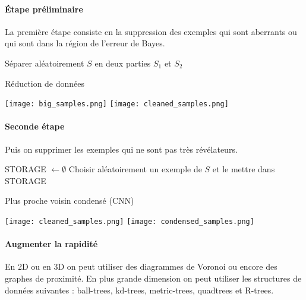 \paragraph{Étape préliminaire}
La première étape consiste en la suppression des exemples qui sont aberrants ou qui sont dans la région de l'erreur de Bayes.
\begin{center}
	\begin{algorithm}[H]
		Séparer aléatoirement $S$ en deux parties $S_1$ et $S_2$\;
		\caption{Réduction de données}
	\end{algorithm}
	
	\texttt{[image: big\_samples.png]}
	\texttt{[image: cleaned\_samples.png]}
\end{center}

\paragraph{Seconde étape}
Puis on supprimer les exemples qui ne sont pas très révélateurs.
\begin{center}
	\begin{algorithm}[H]
		STORAGE $\gets \emptyset$\; 
		Choisir aléatoirement un exemple de $S$ et le mettre dans STORAGE\;
		\caption{Plus proche voisin condensé (CNN)}
	\end{algorithm}
	
	\texttt{[image: cleaned\_samples.png]}
	\texttt{[image: condensed\_samples.png]}
\end{center}

\paragraph{Augmenter la rapidité}
En 2D ou en 3D on peut utiliser des diagrammes de Voronoi ou encore des graphes de proximité.
En plus grande dimension on peut utiliser les structures de données suivantes : ball-trees, kd-trees, metric-trees, quadtrees et R-trees.
